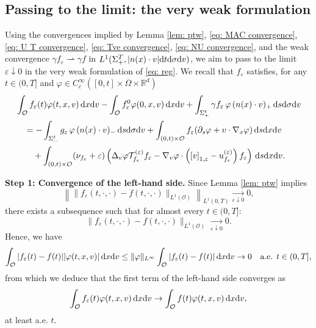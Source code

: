 \documentclass[10pt, reqno]{amsart}
\theoremstyle{plain}
\theoremstyle{definition}
\theoremstyle{remark}
\numberwithin{equation}{section}
\newcommand{\calO}{\mathcal O}
\newcommand{\calT}{\mathcal T}
\newcommand{\p}{\partial}
\newcommand{\R}{\mathbb{R}}
\newcommand{\ve}{\varepsilon}
\newcommand{\dx}{\textnormal{d}x}
\newcommand{\dv}{\textnormal{d}v}
\newcommand{\dt}{\textnormal{d}t}
\newcommand{\ds}{\textnormal{d}s}
\newcommand{\tnd}{\textnormal{d}}
\newcommand{\weakto}{\rightharpoonup}
\newcommand{\lt}{\left}
\newcommand{\rt}{\right}
\newcommand{\renorm}[3]{\lt[#1\rt]_{#2 , #3}}
\begin{document}
\subsection{Passing to the limit: the very weak formulation} \label{sec: very weak}
Using the convergences implied by Lemma \ref{lem: ptw}, \eqref{eq: MAC convergence}, \eqref{eq: U T convergence}, \eqref{eq: Tve convergence}, \eqref{eq: NU convergence}, and the weak convergence $\gamma f_\ve \weakto \gamma f$ in $L^1(\Sigma_+^T, |n(x)\cdot v|\dt\tnd\sigma\dv)$, we aim to pass to the limit $\ve\downarrow 0$ in the very weak formulation of \eqref{eq: reg}. We recall that $f_\ve$ satisfies, for any $t\in (0,T]$ and $\varphi\in C_c^\infty([0,t]\times \overline{\Omega} \times \R^d)$
\begin{equation} \label{eq: ve weak form}
\begin{split}
    &\int_{\calO} f_\ve(t) \varphi(t,x,v) \,\dx\dv - \int_{\calO} f_\ve^0 \varphi(0,x,v)\,\dx\dv + \int_{\Sigma_+^t} \gamma f_\ve \, \varphi \, (n(x)\cdot v)_+ \,\ds\tnd\sigma\dv \\
    &\quad= - \int_{\Sigma_-^t} g_\ve \, \varphi \, (n(x)\cdot v)_- \,\ds\tnd\sigma\dv +\int_{(0,t)\times \calO} f_\ve (\p_s \varphi + v\cdot \nabla_x \varphi) \,\ds\dx\dv\\
    &\qquad + \int_{(0,t)\times \calO} (\nu_{f_\ve} + \ve) \lt(\Delta_v \varphi \calT_{f_\ve}^{(\ve)} f_\ve - \nabla_v\varphi \cdot \lt(\renorm{v}{1}{\ve}-u_{f_\ve}^{(\ve)} \rt) f_\ve \rt) \, \ds\dx\dv.
\end{split}\end{equation}
%
%
%
%
%
%

\medskip
\noindent \textbf{Step 1: Convergence of the left-hand side.}
Since Lemma \ref{lem: ptw} implies
\[
    \lt\| \|f_\ve(t,\cdot,\cdot) - f(t,\cdot,\cdot)\|_{L^1(\calO)} \rt\|_{L^1(0,T)} \xrightarrow[\ve\downarrow 0]{} 0, 
\]
there exists a subsequence such that for almost every $t\in (0,T]$:
\[
    \|f_\ve(t,\cdot,\cdot) - f(t,\cdot,\cdot)\|_{L^1(\calO)} \xrightarrow[\ve\downarrow 0]{} 0.
\]
Hence, we have
\[
    \int_{\calO} |f_\ve(t) - f(t)| |\varphi(t,x,v)| \,\dx\dv \le \|\varphi\|_{L^\infty} \int_{\calO} |f_\ve(t) - f(t)| \,\dx\dv \to 0 \quad \text{a.e. }t\in (0,T],
\]
from which we deduce that the first term of the left-hand side converges as
\[
    \int_{\calO} f_\ve(t) \varphi(t,x,v) \,\dx\dv \to \int_{\calO} f(t) \varphi(t,x,v) \,\dx\dv,
\]
at least a.e. $t$.
\end{document}
